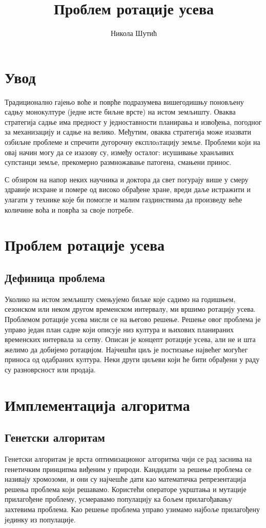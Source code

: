\documentclass[12pt,fleqn]{article}
\title{Проблем ротације усева}
\author{Никола Шутић}
\affil{Математички факултет, Универзитет у Београду}
\begin{document}
\maketitle
\newpage

\tableofcontents
\newpage

\section{Увод}
Традиционално гајењо воће и поврће подразумева вишегодишњу поновљену садњу монокултуре (једне исте биљне врсте) на истом земљишту. Оваква стратегија садње има предност у једноставности планирања и извођења, погодног за механизацију и садње на велико. Међутим, оваква стратегија може изазвати озбиљне проблеме и спречити дугорочну експлоaтацију земље. Проблеми који на овај начин могу да се изазову су, између осталог: исушивање хранљивих супстанци земље, прекомерно размножавање патогена, смањени принос.

С обзиром на напор неких научника и доктора да свет погурају више у смеру здравије исхране и помере од високо обрађене хране, вреди даље истражити и улагати у технике које би помогле и малим газдинствима да произведу веће количине воћа и поврћа за своје потребе.

\section{Проблем ротације усева}
\subsection{Дефиница проблема}
Уколико на истом земљишту смењујемо биљке које садимо на годишњем, сезонском или неком другом временском интервалу, ми вршимо ротацију усева. Проблемом ротације усева мисли се на његово решење. Решење овог проблема је управо један план садне који описује низ култура и њихових планираних временских интервала за сетву. Описан је концепт ротације усева, али не и шта желимо да добијемо ротацијом. Најчешћи циљ је постизање највећег могућег приноса од одабраних култура. Неки други циљеви који ће бити обрађени у раду су разноврсност или продаја.

\section{Имплементација алгоритма}
\subsection{Генетски алгоритам}
Генетски алгоритам је врста оптимизационог алгоритма чији се рад заснива на генетичким принципма виђеним у природи. Кандидати за решење проблема се називају хромозоми, и они су најчешће дати као математичка репрезентација решења проблема који решавамо. Користећи операторе укрштања и мутације прилагођене проблему, усмеравамо популацију ка бољем прилагођавању захтевима проблема. Као решење проблема управо узимамо најбоље прилагођену јединку из популације.
\end{document}
